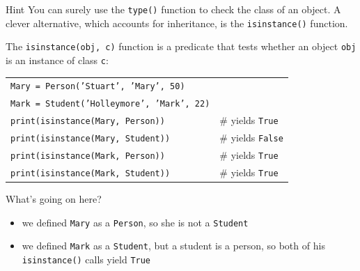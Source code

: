 \documentclass[t,handout,9pt]{beamer}
\begin{document}
%
\begin{frame}
\vfill
\begin{block}{Hint}
You can surely use the \texttt{type()} function to check the class of an object. A clever alternative, which accounts for inheritance, is the \texttt{isinstance()} function.
\end{block}
The \texttt{isinstance(obj, c)} function is a predicate that tests whether an object \texttt{obj} is an instance of class \texttt{c}:
\begin{table}[]
\begin{flushleft}
\begin{tabular}{ll}
\texttt{Mary = Person('Stuart', 'Mary', 50)} &  \\
\texttt{Mark = Student('Holleymore', 'Mark', 22)} & \\
\texttt{print(isinstance(Mary, Person))} & \# yields \texttt{True} \\
\texttt{print(isinstance(Mary, Student))} & \# yields \texttt{False} \\
\texttt{print(isinstance(Mark, Person))} & \# yields \texttt{True} \\
\texttt{print(isinstance(Mark, Student))} & \# yields \texttt{True} \\
\end{tabular}
\end{flushleft}
\end{table}
\vfill
What's going on here?
\begin{itemize}
	\item we defined \texttt{Mary} as a \texttt{Person}, so she is not a \texttt{Student}
	\item we defined \texttt{Mark} as a \texttt{Student}, but a student is a person, so both of his \texttt{isinstance()} calls yield \texttt{True}
\end{itemize}
\vfill
\end{frame}
%
\end{document}
